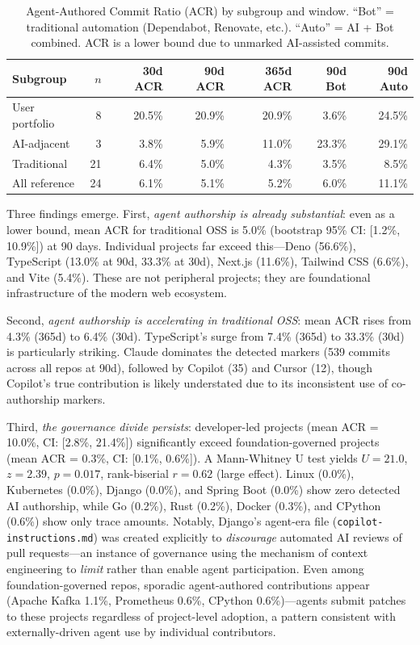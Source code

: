 \documentclass[sigconf, nonacm, anonymous=false]{acmart}
\begin{document}
\begin{table}[ht]
\centering
\small
\begin{tabularx}{\textwidth}{lrrrrrr}
\toprule
\textbf{Subgroup} & \textbf{$n$} & \textbf{30d ACR} & \textbf{90d ACR} & \textbf{365d ACR} & \textbf{90d Bot} & \textbf{90d Auto} \\
\midrule
User portfolio & 8 & 20.5\% & 20.9\% & 20.9\% & 3.6\% & 24.5\% \\
AI-adjacent & 3 & 3.8\% & 5.9\% & 11.0\% & 23.3\% & 29.1\% \\
Traditional & 21 & 6.4\% & 5.0\% & 4.3\% & 3.5\% & 8.5\% \\
\midrule
All reference & 24 & 6.1\% & 5.1\% & 5.2\% & 6.0\% & 11.1\% \\
\bottomrule
\end{tabularx}
\caption{Agent-Authored Commit Ratio (ACR) by subgroup and window. ``Bot'' = traditional automation (Dependabot, Renovate, etc.). ``Auto'' = AI + Bot combined. ACR is a lower bound due to unmarked AI-assisted commits.}
\label{tab:acr}
\end{table}

Three findings emerge. First, \textit{agent authorship is already substantial}: even as a lower bound, mean ACR for traditional OSS is 5.0\% (bootstrap 95\% CI: [1.2\%, 10.9\%]) at 90 days. Individual projects far exceed this---Deno (56.6\%), TypeScript (13.0\% at 90d, 33.3\% at 30d), Next.js (11.6\%), Tailwind CSS (6.6\%), and Vite (5.4\%). These are not peripheral projects; they are foundational infrastructure of the modern web ecosystem.

Second, \textit{agent authorship is accelerating in traditional OSS}: mean ACR rises from 4.3\% (365d) to 6.4\% (30d). TypeScript's surge from 7.4\% (365d) to 33.3\% (30d) is particularly striking. Claude dominates the detected markers (539 commits across all repos at 90d), followed by Copilot (35) and Cursor (12), though Copilot's true contribution is likely understated due to its inconsistent use of co-authorship markers.

Third, \textit{the governance divide persists}: developer-led projects (mean ACR = 10.0\%, CI: [2.8\%, 21.4\%]) significantly exceed foundation-governed projects (mean ACR = 0.3\%, CI: [0.1\%, 0.6\%]). A Mann-Whitney U test yields $U=21.0$, $z=2.39$, $p=0.017$, rank-biserial $r=0.62$ (large effect). Linux (0.0\%), Kubernetes (0.0\%), Django (0.0\%), and Spring Boot (0.0\%) show zero detected AI authorship, while Go (0.2\%), Rust (0.2\%), Docker (0.3\%), and CPython (0.6\%) show only trace amounts. Notably, Django's agent-era file (\texttt{copilot-instructions.md}) was created explicitly to \textit{discourage} automated AI reviews of pull requests---an instance of governance using the mechanism of context engineering to \textit{limit} rather than enable agent participation. Even among foundation-governed repos, sporadic agent-authored contributions appear (Apache Kafka 1.1\%, Prometheus 0.6\%, CPython 0.6\%)---agents submit patches to these projects regardless of project-level adoption, a pattern consistent with externally-driven agent use by individual contributors.
\end{document}
